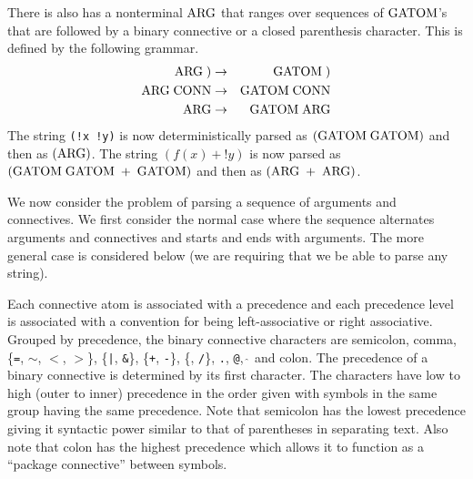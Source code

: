\documentclass{article}
\newcommand{\mtt}[1]{\mbox{\tt #1}}
\begin{document}
There is also has a nonterminal $\mathrm{ARG}$ that ranges over sequences of $\mathrm{GATOM}$'s that are followed by a binary connective or a closed parenthesis character.
This is defined by the following grammar.
\begin{eqnarray*}
  \mathrm{ARG}\;) & \rightarrow & \mathrm{GATOM}\;) \\
  \mathrm{ARG}\; \mathrm{CONN} & \rightarrow & \mathrm{GATOM}\; \mathrm{CONN} \\
  \mathrm{ARG} & \rightarrow & \mathrm{GATOM} \; \mathrm{ARG}
\end{eqnarray*}
The string {\tt (!x !y)} is now deterministically parsed as $(\mathrm{GATOM}\; \mathrm{GATOM})$ and then as $(\mathrm{ARG})$.  The string $(f(x) + !y)$ is now
parsed as $(\mathrm{GATOM}\;\mathrm{GATOM}\; +\; \mathrm{GATOM})$ and then as $(\mathrm{ARG}\; + \;\mathrm{ARG})$.

We now consider the problem of parsing a sequence of arguments and connectives.  We first consider the normal case
where the sequence alternates arguments and connectives and starts and ends with arguments.
The more general case is considered below (we are requiring that we be able to parse any string).

Each connective atom is associated with a precedence and each precedence level is associated with a convention for being left-associative or right associative.
Grouped by precedence, the binary connective characters are
semicolon, comma, \{{\tt =}, {\tt $\sim$}, {\tt $<$}, {\tt $>$}\}, \{\mtt{|}, {\tt \&}\}, \{{\tt +}, {\tt -}\}, \{{\tt *}, {\tt /}\}, {\tt .}, {\tt @}, \mtt{$\hat{~}$} and colon.
The precedence of a binary connective is determined by its first character.  The characters have low to high (outer to inner) precedence in the order given with symbols in the same group having the same precedence.
Note that semicolon has the lowest precedence giving it syntactic power similar to that of parentheses in separating text.  Also note that colon has the highest precedence
which allows it to function as a ``package connective'' between symbols.
\end{document}
